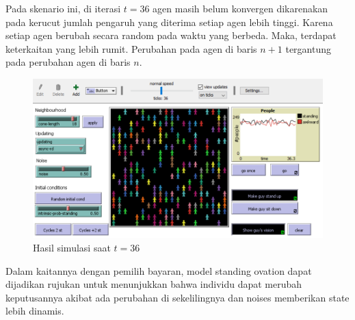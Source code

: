 \begin{itemize}
	Pada skenario ini, di iterasi $t=36$ agen masih belum konvergen dikarenakan pada kerucut jumlah pengaruh yang diterima setiap agen lebih tinggi. Karena setiap agen berubah secara random pada waktu yang berbeda. Maka, terdapat keterkaitan yang lebih rumit. Perubahan pada agen di baris $n+1$ tergantung pada perubahan agen di baris $n$.

	\begin{figure}[H]
	\centering
	\includegraphics[width=\linewidth]{images/ch03/sop16}
	\caption{Hasil simulasi saat $t=36$}
	\label{fig:sop13}
	\end{figure}
\end{itemize}

Dalam kaitannya dengan pemilih bayaran, model standing ovation dapat dijadikan rujukan untuk menunjukkan bahwa individu dapat merubah keputusannya akibat ada perubahan di sekelilingnya dan noises memberikan state lebih dinamis.
